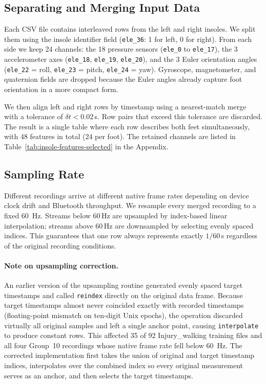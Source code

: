 \documentclass[11pt,a4paper,twocolumn]{article}
\begin{document}
\subsection{Separating and Merging Input Data}
Each CSV file contains interleaved rows from the left and right insoles. We split them using the insole identifier field (\texttt{ele\_36}: 1 for left, 0 for right). From each side we keep 24 channels: the 18 pressure sensors (\texttt{ele\_0} to \texttt{ele\_17}), the 3 accelerometer axes (\texttt{ele\_18}, \texttt{ele\_19}, \texttt{ele\_20}), and the 3 Euler orientation angles (\texttt{ele\_22} = roll, \texttt{ele\_23} = pitch, \texttt{ele\_24} = yaw). Gyroscope, magnetometer, and quaternion fields are dropped because the Euler angles already capture foot orientation in a more compact form.

We then align left and right rows by timestamp using a nearest-match merge with a tolerance of $\delta t < 0.02$\,s. Row pairs that exceed this tolerance are discarded. The result is a single table where each row describes both feet simultaneously, with 48 features in total (24 per foot). The retained channels are listed in Table~\ref{tab:insole-features-selected} in the Appendix.

\subsection{Sampling Rate}
Different recordings arrive at different native frame rates depending on device clock drift and Bluetooth throughput. We resample every merged recording to a fixed \SI{60}{Hz}. Streams below 60\,Hz are upsampled by index-based linear interpolation; streams above 60\,Hz are downsampled by selecting evenly spaced indices. This guarantees that one row always represents exactly $1/60$\,s regardless of the original recording conditions.

\paragraph{Note on upsampling correction.}
An earlier version of the upsampling routine generated evenly spaced target timestamps and called \texttt{reindex} directly on the original data frame. Because target timestamps almost never coincided exactly with recorded timestamps (floating-point mismatch on ten-digit Unix epochs), the operation discarded virtually all original samples and left a single anchor point, causing \texttt{interpolate} to produce constant rows. This affected 35 of 92 Injury\_walking training files and all four Group~10 recordings whose native frame rate fell below \SI{60}{Hz}. The corrected implementation first takes the union of original and target timestamp indices, interpolates over the combined index so every original measurement serves as an anchor, and then selects the target timestamps.
\end{document}
